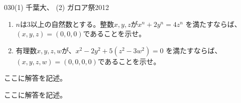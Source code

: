 \begin{prob}{030}{}{(1) 千葉大、 (2) ガロア祭2012}
 \begin{enumerate}
  \item $n$は3以上の自然数とする。整数$x,y,z$が$x^n+2y^n=4z^n$ を満たすならば、$(x,y,z)=(0,0,0)$であることを示せ。
  \item 有理数$x,y,z,w$が、$x^2-2y^2+5(z^2-3w^2)=0$ を満たすならば、$(x,y,z,w)=(0,0,0,0)$であることを示せ。
 \end{enumerate}
\end{prob}
ここに解答を記述。

ここに解答を記述。